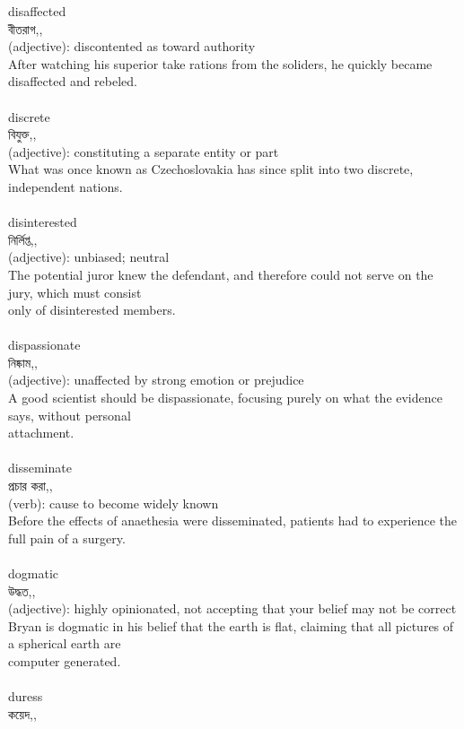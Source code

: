 \documentclass{article}
\begin{document}
{disaffected}\\
{বীতরাগ,,}\\
{(adjective): discontented as toward authority\\After watching his superior take rations from the soliders, he quickly became disaffected and rebeled.\\}\\
{discrete}\\
{বিযুক্ত,,}\\
{(adjective): constituting a separate entity or part\\What was once known as Czechoslovakia has since split into two discrete, independent nations.\\}\\
{disinterested}\\
{নির্লিপ্ত,,}\\
{(adjective): unbiased; neutral\\The potential juror knew the defendant, and therefore could not serve on the jury, which must consist\\only of disinterested members.\\}\\
{dispassionate}\\
{নিষ্কাম,,}\\
{(adjective): unaffected by strong emotion or prejudice\\A good scientist should be dispassionate, focusing purely on what the evidence says, without personal\\attachment.\\}\\
{disseminate}\\
{প্রচার করা,,}\\
{(verb): cause to become widely known\\Before the effects of anaethesia were disseminated, patients had to experience the full pain of a surgery.\\}\\
{dogmatic}\\
{উদ্ধত,,}\\
{(adjective): highly opinionated, not accepting that your belief may not be correct\\Bryan is dogmatic in his belief that the earth is flat, claiming that all pictures of a spherical earth are\\computer generated.\\}\\
{duress}\\
{কয়েদ,,}\\
\end{document}
